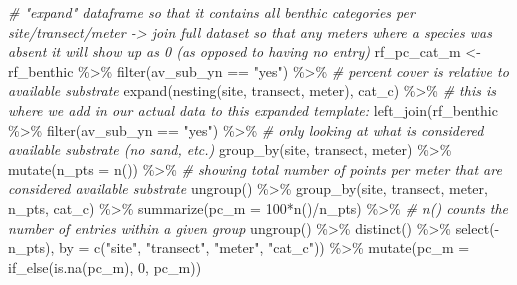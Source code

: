 \documentclass[
]{article}
\newenvironment{Shaded}{\begin{snugshade}}{\end{snugshade}}
\newcommand{\AttributeTok}[1]{\textcolor[rgb]{0.77,0.63,0.00}{#1}}
\newcommand{\CommentTok}[1]{\textcolor[rgb]{0.56,0.35,0.01}{\textit{#1}}}
\newcommand{\DecValTok}[1]{\textcolor[rgb]{0.00,0.00,0.81}{#1}}
\newcommand{\FunctionTok}[1]{\textcolor[rgb]{0.00,0.00,0.00}{#1}}
\newcommand{\NormalTok}[1]{#1}
\newcommand{\OtherTok}[1]{\textcolor[rgb]{0.56,0.35,0.01}{#1}}
\newcommand{\SpecialCharTok}[1]{\textcolor[rgb]{0.00,0.00,0.00}{#1}}
\newcommand{\StringTok}[1]{\textcolor[rgb]{0.31,0.60,0.02}{#1}}
\begin{document}
\begin{Shaded}
\begin{Highlighting}[]
\CommentTok{\# "expand" dataframe so that it contains all benthic categories per site/transect/meter {-}\textgreater{} join full dataset so that any meters where a species was absent it will show up as 0 (as opposed to having no entry)}
\NormalTok{rf\_pc\_cat\_m }\OtherTok{\textless{}{-}}\NormalTok{ rf\_benthic }\SpecialCharTok{\%\textgreater{}\%}
  \FunctionTok{filter}\NormalTok{(av\_sub\_yn }\SpecialCharTok{==} \StringTok{"yes"}\NormalTok{) }\SpecialCharTok{\%\textgreater{}\%} \CommentTok{\# percent cover is relative to available substrate}
  \FunctionTok{expand}\NormalTok{(}\FunctionTok{nesting}\NormalTok{(site, transect, meter), cat\_c) }\SpecialCharTok{\%\textgreater{}\%}
  \CommentTok{\# this is where we add in our actual data to this expanded template:}
  \FunctionTok{left\_join}\NormalTok{(rf\_benthic }\SpecialCharTok{\%\textgreater{}\%} 
              \FunctionTok{filter}\NormalTok{(av\_sub\_yn }\SpecialCharTok{==} \StringTok{"yes"}\NormalTok{) }\SpecialCharTok{\%\textgreater{}\%} \CommentTok{\# only looking at what is considered available substrate (no sand, etc.)}
              \FunctionTok{group\_by}\NormalTok{(site, transect, meter) }\SpecialCharTok{\%\textgreater{}\%}
              \FunctionTok{mutate}\NormalTok{(}\AttributeTok{n\_pts =} \FunctionTok{n}\NormalTok{()) }\SpecialCharTok{\%\textgreater{}\%} \CommentTok{\# showing total number of points per meter that are considered available substrate}
              \FunctionTok{ungroup}\NormalTok{() }\SpecialCharTok{\%\textgreater{}\%}
              \FunctionTok{group\_by}\NormalTok{(site, transect, meter, n\_pts, cat\_c) }\SpecialCharTok{\%\textgreater{}\%}
              \FunctionTok{summarize}\NormalTok{(}\AttributeTok{pc\_m =} \DecValTok{100}\SpecialCharTok{*}\FunctionTok{n}\NormalTok{()}\SpecialCharTok{/}\NormalTok{n\_pts) }\SpecialCharTok{\%\textgreater{}\%} \CommentTok{\# n() counts the number of entries within a given group}
              \FunctionTok{ungroup}\NormalTok{() }\SpecialCharTok{\%\textgreater{}\%}
              \FunctionTok{distinct}\NormalTok{() }\SpecialCharTok{\%\textgreater{}\%}
              \FunctionTok{select}\NormalTok{(}\SpecialCharTok{{-}}\NormalTok{n\_pts), }
            \AttributeTok{by =} \FunctionTok{c}\NormalTok{(}\StringTok{"site"}\NormalTok{, }\StringTok{"transect"}\NormalTok{, }\StringTok{"meter"}\NormalTok{, }\StringTok{"cat\_c"}\NormalTok{)) }\SpecialCharTok{\%\textgreater{}\%}
  \FunctionTok{mutate}\NormalTok{(}\AttributeTok{pc\_m =} \FunctionTok{if\_else}\NormalTok{(}\FunctionTok{is.na}\NormalTok{(pc\_m), }\DecValTok{0}\NormalTok{, pc\_m))}


\end{Highlighting}
\end{Shaded}
\end{document}
